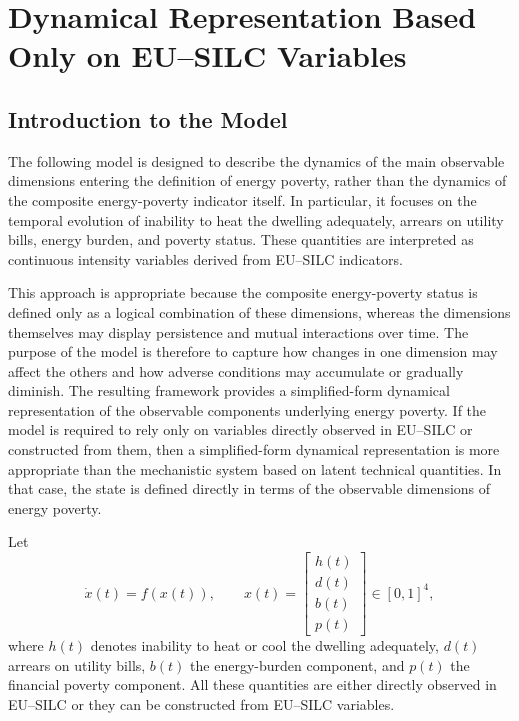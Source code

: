 \documentclass[11pt,a4paper]{article}
\begin{document}
\section{ Dynamical Representation Based Only on EU--SILC Variables}
\subsection{Introduction to the Model}

The following model is designed to describe the dynamics of the main observable dimensions entering the definition of energy poverty, rather than the dynamics of the composite energy-poverty indicator itself. In particular, it focuses on the temporal evolution of inability to heat the dwelling adequately, arrears on utility bills, energy burden, and poverty status. These quantities are interpreted as continuous intensity variables derived from EU--SILC indicators.

This approach is appropriate because the composite energy-poverty status is defined only as a logical combination of these dimensions, whereas the dimensions themselves may display persistence and mutual interactions over time. The purpose of the model is therefore to capture how changes in one dimension may affect the others and how adverse conditions may accumulate or gradually diminish. The resulting framework provides a simplified-form dynamical representation of the observable components underlying energy poverty.
If the model is required to rely only on variables directly observed in EU--SILC or constructed from them, then a simplified-form dynamical representation is more appropriate than the mechanistic system based on latent technical quantities. In that case, the state is defined directly in terms of the observable dimensions of energy poverty.

Let
\[
\dot{x}(t) = f(x(t)), 
\qquad 
x(t)=
\begin{bmatrix}
h(t)\\
d(t)\\
b(t)\\
p(t)
\end{bmatrix}\in[0,1]^4,
\]
where \(h(t)\) denotes inability to heat or cool the dwelling adequately, \(d(t)\) arrears on utility bills, \(b(t)\) the energy-burden component, and \(p(t)\) the financial poverty component. All these quantities are either directly observed in EU--SILC or they can be constructed from EU--SILC variables.
\end{document}
